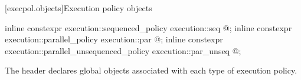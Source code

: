 [execpol.objects]{Execution policy objects}

%
%
%
%
%
%
\begin{itemdecl}
inline constexpr execution::sequenced_policy            execution::seq{ @\unspec@ };
inline constexpr execution::parallel_policy             execution::par{ @\unspec@ };
inline constexpr execution::parallel_unsequenced_policy execution::par_unseq{ @\unspec@ };
\end{itemdecl}

\begin{itemdescr}
\pnum
The header  declares global objects associated with each type of execution policy.
\end{itemdescr}
